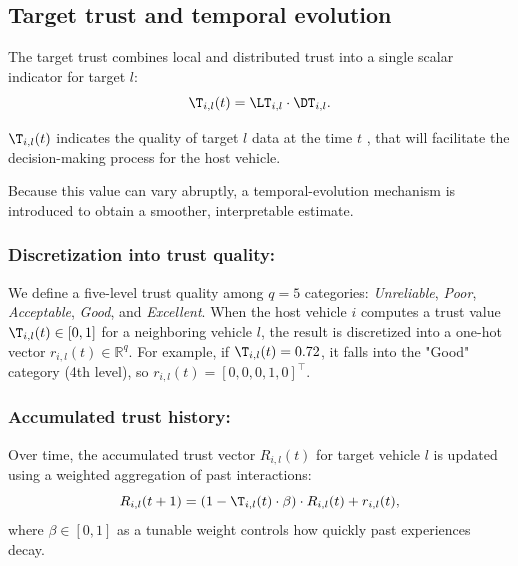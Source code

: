 \subsection{Target trust and temporal evolution}\label{subsec_evolution}
\vspace*{-0.2cm}
The target trust combines local and distributed trust into a single scalar indicator for target $l$: 
\begin{equation}
    \T_{i,l}(t) =  \LT_{i,l} \cdot \DT_{i,l}. 
    \label{trs_sample_genral}
\end{equation}

$\T_{i,l}(t)$ indicates the quality of target $l$ data at the time $t$ , that will facilitate the decision-making process for the host vehicle.

Because this value can vary abruptly, a temporal-evolution mechanism is introduced to obtain a smoother, interpretable estimate.
\subsubsection{Discretization into trust quality:}
We define a five-level trust quality among $q = 5$ categories: \textit{Unreliable}, \textit{Poor}, \textit{Acceptable}, \textit{Good}, and \textit{Excellent}. When the host vehicle $i$ computes a trust value $\T_{i,l}(t) \in [0, 1]$ for a neighboring vehicle $l$, the result is discretized into a one-hot vector $r_{i,l}(t) \in \mathbb{R}^q$. For example, if $\T_{i,l}(t) = 0.72$, it falls into the "Good" category (4th level), so $r_{i,l}(t) = [0, 0, 0, 1, 0]^{\top}$.
\subsubsection{Accumulated trust history:}
Over time, the accumulated trust vector $R_{i,l}(t)$ for target vehicle $l$ is updated using a weighted aggregation of past interactions: 
\begin{equation}
    R_{i,l}(t + 1) = \left(1 - \T_{i,l}(t) \cdot \beta \right) \cdot R_{i,l}(t) + r_{i,l}(t),
\end{equation}
where $\beta \in [0, 1]$ as a tunable weight controls how quickly past experiences decay. 

